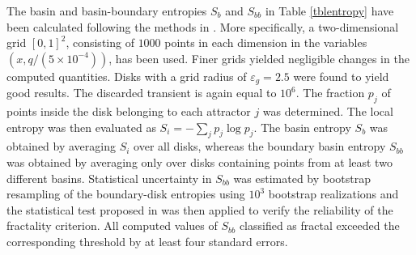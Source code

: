 \documentclass{article}
\theoremstyle{plain}
\theoremstyle{definition}
\begin{document}
The basin and basin-boundary entropies $S_b$ and $S_{bb}$ in Table \ref{tblentropy} have been calculated following the methods in \cite{entropy1,entropy2,entropy3}. More specifically, a two-dimensional grid $[0,1]^2$, consisting of $1000$ points in each dimension in the variables $(x,q/(5\times 10^{-4}))$, has been used. Finer grids yielded negligible changes in the computed quantities. Disks with a grid radius of $\varepsilon_g=2.5$ were found to yield good results. The discarded transient is again equal to $10^6$. The fraction $p_j$ of points inside the disk belonging to each attractor $j$ was determined. The local entropy was then evaluated as $S_i=-\sum_j p_j\log p_j$. The basin entropy $S_b$ was obtained by averaging $S_i$ over all disks, whereas the boundary basin entropy $S_{bb}$ was obtained by averaging only over disks containing points from at least two different basins. Statistical uncertainty in $S_{bb}$ was estimated by bootstrap resampling of the boundary-disk entropies using $10^3$ bootstrap realizations and the statistical test proposed in \cite{entropy2} was then applied to verify the reliability of the fractality criterion. All computed values of $S_{bb}$ classified as fractal exceeded the corresponding threshold by at least four standard errors.



  
\end{document}
